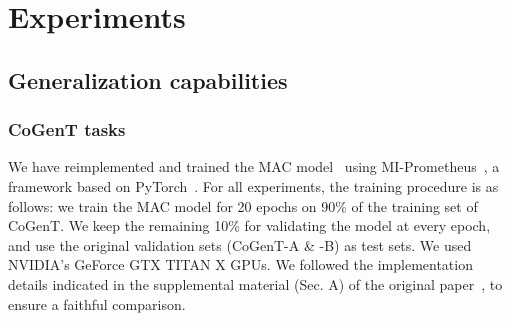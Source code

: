 \section{Experiments}

\subsection{Generalization capabilities}

\subsubsection{CoGenT tasks}

We have reimplemented and trained the MAC model~\cite{hudson2018compositional} using MI-Prometheus~\cite{kornuta2018accelerating}, a framework based on PyTorch~\cite{paszke2017automatic}.
For all experiments, the training procedure is as follows: we train the MAC model for 20 epochs on 90\% of the training set of CoGenT. We keep the remaining 10\% for validating the model at every epoch, and use the original validation sets (CoGenT-A  \& -B) as test sets.
We used NVIDIA's GeForce GTX TITAN X GPUs. We followed the implementation details indicated in the supplemental material (Sec. A) of the original paper~\cite{hudson2018compositional}, to ensure a faithful comparison.


